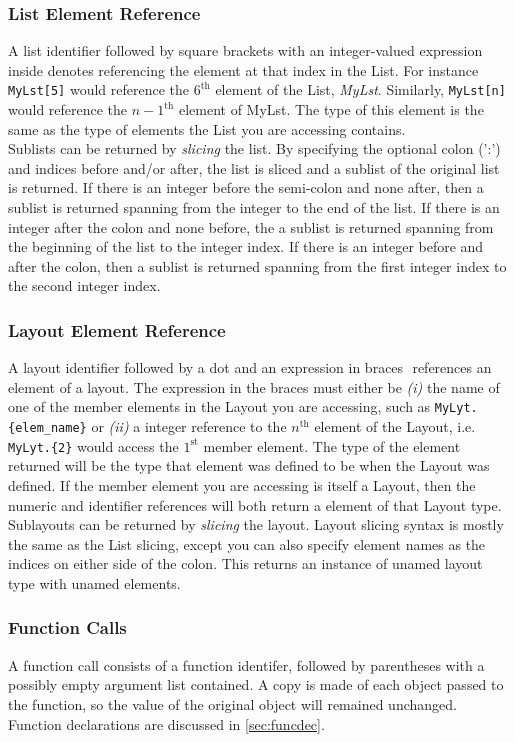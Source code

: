 \documentclass{article}
\begin{document}
\subsubsection{List Element Reference}
A list identifier followed by square brackets with an integer-valued expression inside denotes referencing the element at that index in the List. For instance \lstinline!MyLst[5]! would reference the $6^\mathrm{th}$ element of the List, \emph{MyLst}. Similarly, \lstinline!MyLst[n]! would reference the $n-1^\mathrm{th}$ element of MyLst. The type of this element is the same as the type of elements the List you are accessing contains. \\
Sublists can be returned by \emph{slicing} the list. By specifying the optional colon (':') and indices before and/or after, the list is sliced and a sublist of the original list is returned. If there is an integer before the semi-colon and none after, then a sublist is returned spanning from the integer to the end of the list. If there is an integer after the colon and none before, the a sublist is returned spanning from the beginning of the list to the integer index. If there is an integer before and after the colon, then a sublist is returned spanning from the first integer index to the second integer index.

\subsubsection{Layout Element Reference}
\label{sec:layoutref}
A layout identifier followed by a dot and an expression in braces ${ }$ references an element of a layout. The expression in the braces must either be \emph{(i)} the name of one of the member elements in the Layout you are accessing, such as \lstinline!MyLyt.{elem_name}! or \emph{(ii)} a integer reference to the $n^\mathrm{th}$ element of the Layout, i.e. \lstinline!MyLyt.{2}! would access the $1^\mathrm{st}$ member element. The type of the element returned will be the type that element was defined to be when the Layout was defined. If the member element you are accessing is itself a Layout, then the numeric and identifier references will both return a element of that Layout type. 
Sublayouts can be returned by \emph{slicing} the layout. Layout slicing syntax is mostly the same as the List slicing, except you can also specify element names as the indices on either side of the colon. This returns an instance of unamed layout type with unamed elements.

\subsubsection{Function Calls}
A function call consists of a function identifer, followed by parentheses with a possibly empty argument list contained. A copy is made of each object passed to the function, so the value of the original object will remained unchanged. Function declarations are discussed in \ref{sec:funcdec}.
\end{document}
